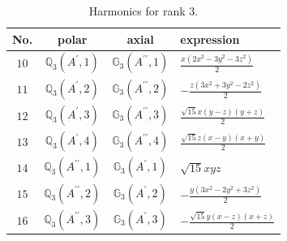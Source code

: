 \documentclass[fleqn,8pt,landscape]{jsarticle}
\begin{document}
\begin{table}[ht!]
\begin{center}
\caption{Harmonics for rank 3.}
\renewcommand{\arraystretch}{1.3}
\begin{tabular}{cccl} \hline \hline
No. & polar & axial & expression \\ \hline
$ 10 $ & $ \mathbb{Q}_{3}(A^{\prime},1) $ & $ \mathbb{G}_{3}(A^{\prime\prime},1) $ & $ \frac{x \left(2 x^{2} - 3 y^{2} - 3 z^{2}\right)}{2} $ \\
$ 11 $ & $ \mathbb{Q}_{3}(A^{\prime},2) $ & $ \mathbb{G}_{3}(A^{\prime\prime},2) $ & $ - \frac{z \left(3 x^{2} + 3 y^{2} - 2 z^{2}\right)}{2} $ \\
$ 12 $ & $ \mathbb{Q}_{3}(A^{\prime},3) $ & $ \mathbb{G}_{3}(A^{\prime\prime},3) $ & $ \frac{\sqrt{15} x \left(y - z\right) \left(y + z\right)}{2} $ \\
$ 13 $ & $ \mathbb{Q}_{3}(A^{\prime},4) $ & $ \mathbb{G}_{3}(A^{\prime\prime},4) $ & $ \frac{\sqrt{15} z \left(x - y\right) \left(x + y\right)}{2} $ \\
$ 14 $ & $ \mathbb{Q}_{3}(A^{\prime\prime},1) $ & $ \mathbb{G}_{3}(A^{\prime},1) $ & $ \sqrt{15} x y z $ \\
$ 15 $ & $ \mathbb{Q}_{3}(A^{\prime\prime},2) $ & $ \mathbb{G}_{3}(A^{\prime},2) $ & $ - \frac{y \left(3 x^{2} - 2 y^{2} + 3 z^{2}\right)}{2} $ \\
$ 16 $ & $ \mathbb{Q}_{3}(A^{\prime\prime},3) $ & $ \mathbb{G}_{3}(A^{\prime},3) $ & $ - \frac{\sqrt{15} y \left(x - z\right) \left(x + z\right)}{2} $ \\
 \hline \hline
\end{tabular}
\end{center}
\end{table}
\end{document}
